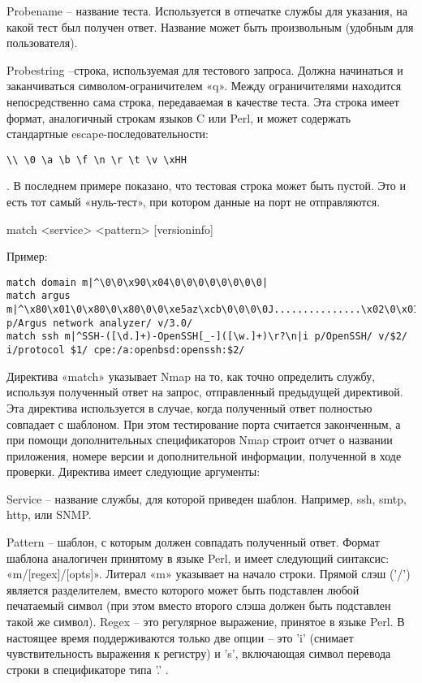 \documentclass[12pt,a4paper]{report}
\begin{document}
Probename – название теста. Используется в отпечатке службы для указания, на какой тест был получен ответ. Название может быть произвольным (удобным для пользователя).

Probestring –строка, используемая для тестового запроса. Должна начинаться и заканчиваться символом-ограничителем «q». Между ограничителями находится непосредственно сама строка, передаваемая в качестве теста. Эта строка имеет формат, аналогичный строкам языков C или Perl, и может содержать стандартные escape-последовательности: \begin{verbatim}\\ \0 \a \b \f \n \r \t \v \xHH 
\end{verbatim}. В последнем примере показано, что тестовая строка может быть пустой. Это и есть тот самый «нуль-тест», при котором данные на порт не отправляются.



match <service> <pattern> [versioninfo]

Пример:
\begin{verbatim}
match domain m|^\0\0\x90\x04\0\0\0\0\0\0\0\0|
match argus m|^\x80\x01\0\x80\0\x80\0\0\xe5az\xcb\0\0\0\0J...............\x02\0\x01\0\0<\x01,.......\0...\0\0\0\0\x01\0\0\0\0\0\0\0\0\0\0\0\0\0\0\0\0\0\0\0\0\0\0\0\0\0\0\0\0\0\0\0\0\0\0\0\0\0\0\0\0\0\0\0\0\0\0\0\0\0\0\0\0\0\0\0\0\0\0\0\0\0\0\0\0\0\0\0\0\xff\xff\xff\xff\x01\x04\0.\0\x80\x08|s p/Argus network analyzer/ v/3.0/
match ssh m|^SSH-([\d.]+)-OpenSSH[_-]([\w.]+)\r?\n|i p/OpenSSH/ v/$2/ i/protocol $1/ cpe:/a:openbsd:openssh:$2/
\end{verbatim}

Директива «match» указывает Nmap на то, как точно определить службу, используя полученный ответ на запрос, отправленный предыдущей директивой. Эта директива используется в случае, когда полученный ответ полностью совпадает с шаблоном. При этом тестирование порта считается законченным, а при помощи дополнительных спецификаторов Nmap строит отчет о названии приложения, номере версии и дополнительной информации, полученной в ходе проверки. Директива имеет следующие аргументы:

Service – название службы, для которой приведен шаблон. Например, ssh, smtp, http, или SNMP.

Pattern – шаблон, с которым должен совпадать полученный ответ. Формат шаблона аналогичен принятому в языке Perl, и имеет следующий синтаксис: «m/[regex]/[opts]». Литерал «m» указывает на начало строки. Прямой слэш ('/') является разделителем, вместо которого может быть подставлен любой печатаемый символ (при этом вместо второго слэша должен быть подставлен такой же символ). Regex – это регулярное выражение, принятое в языке Perl. В настоящее время поддерживаются только две опции – это 'i' (снимает чувствительность выражения к регистру) и 's', включающая символ перевода строки в спецификаторе типа '.' .
\end{document}
